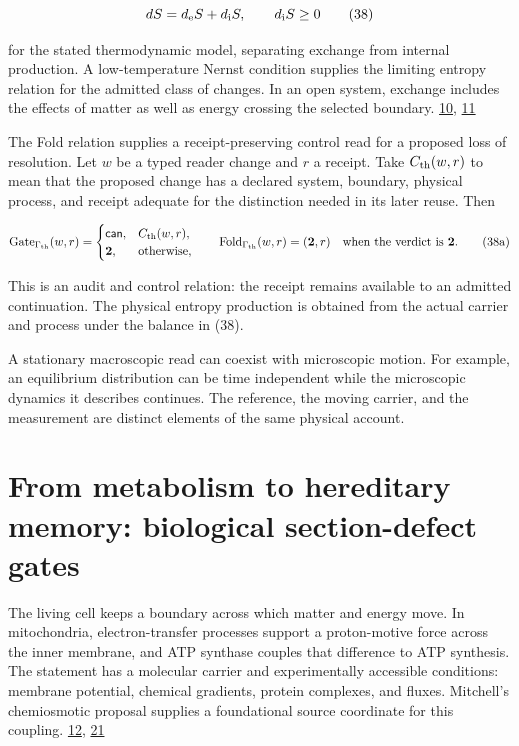 \[
dS=d_{\rm e}S+d_{\rm i}S,
\qquad
d_{\rm i}S\geq0
\tag{38}
\]

for the stated thermodynamic model, separating exchange from internal production. A low-temperature Nernst condition supplies the limiting entropy relation for the admitted class of changes. In an open system, exchange includes the effects of matter as well as energy crossing the selected boundary. \href{https://chatgpt.com/library?file_id=libfile_37ba8f1902d88191a1ecc5aa2a9514dd\&account_id=personal}{10}, \href{https://github.com/Coppalini-Architecture/coppalini-architecture/blob/9b7122ca5c3712c2c294e2bc5097276d0ba9817b/papers/10\%20THERMODYNAMICS_The_Typed_Root_of_Entropy_v0_2.md}{11}

The Fold relation supplies a receipt-preserving control read for a proposed loss of resolution. Let \(w\) be a typed reader change and \(r\) a receipt. Take \(C_{\rm th}(w,r)\) to mean that the proposed change has a declared system, boundary, physical process, and receipt adequate for the distinction needed in its later reuse. Then

\[
\operatorname{Gate}_{\Gamma_{\rm th}}(w,r)=
\begin{cases}
\mathsf{can},&C_{\rm th}(w,r),\\
\mathbf2,&\text{otherwise},
\end{cases}
\qquad
\operatorname{Fold}_{\Gamma_{\rm th}}(w,r)=(\mathbf2,r)
\quad\text{when the verdict is }\mathbf2.
\tag{38a}
\]

This is an audit and control relation: the receipt remains available to an admitted continuation. The physical entropy production is obtained from the actual carrier and process under the balance in (38).

A stationary macroscopic read can coexist with microscopic motion. For example, an equilibrium distribution can be time independent while the microscopic dynamics it describes continues. The reference, the moving carrier, and the measurement are distinct elements of the same physical account.

\hypertarget{from-metabolism-to-hereditary-memory-biological-section-defect-gates}{%
\section{From metabolism to hereditary memory: biological section-defect gates}\label{from-metabolism-to-hereditary-memory-biological-section-defect-gates}}

The living cell keeps a boundary across which matter and energy move. In mitochondria, electron-transfer processes support a proton-motive force across the inner membrane, and ATP synthase couples that difference to ATP synthesis. The statement has a molecular carrier and experimentally accessible conditions: membrane potential, chemical gradients, protein complexes, and fluxes. Mitchell's chemiosmotic proposal supplies a foundational source coordinate for this coupling. \href{https://github.com/Coppalini-Architecture/coppalini-architecture/blob/9b7122ca5c3712c2c294e2bc5097276d0ba9817b/papers/13\%20MEMBRANE_MITOCHONDRIA_CHEMIOSMOSIS_ATP_METABOLIC_CONTROL_v0_1.md}{12}, \href{https://doi.org/10.1038/191144a0}{21}

